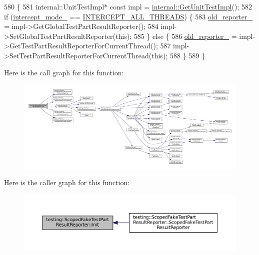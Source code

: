 \begin{DoxyCode}
580                                             \{
581   internal::UnitTestImpl* \textcolor{keyword}{const} impl = \hyperlink{namespacetesting_1_1internal_a9bd0caf5d16512de38b39599c13ee634}{internal::GetUnitTestImpl}();
582   \textcolor{keywordflow}{if} (\hyperlink{classtesting_1_1ScopedFakeTestPartResultReporter_ae62ed825619c11ac21fdd06480e0d982}{intercept\_mode\_} == \hyperlink{classtesting_1_1ScopedFakeTestPartResultReporter_a82f6209b3cf5c4b15ec8bd8041dbc2d5a187f4164aad7fbb9414b263c68a693cd}{INTERCEPT\_ALL\_THREADS}) \{
583     \hyperlink{classtesting_1_1ScopedFakeTestPartResultReporter_a4183b091842a83dd8ce4927746c43092}{old\_reporter\_} = impl->GetGlobalTestPartResultReporter();
584     impl->SetGlobalTestPartResultReporter(\textcolor{keyword}{this});
585   \} \textcolor{keywordflow}{else} \{
586     \hyperlink{classtesting_1_1ScopedFakeTestPartResultReporter_a4183b091842a83dd8ce4927746c43092}{old\_reporter\_} = impl->GetTestPartResultReporterForCurrentThread();
587     impl->SetTestPartResultReporterForCurrentThread(\textcolor{keyword}{this});
588   \}
589 \}
\end{DoxyCode}
Here is the call graph for this function\+:
\nopagebreak
\begin{figure}[H]
\begin{center}
\leavevmode
\includegraphics[width=350pt]{classtesting_1_1ScopedFakeTestPartResultReporter_a28d280a3f5d172d63b94f70b8e7660d7_cgraph}
\end{center}
\end{figure}
Here is the caller graph for this function\+:
\nopagebreak
\begin{figure}[H]
\begin{center}
\leavevmode
\includegraphics[width=350pt]{classtesting_1_1ScopedFakeTestPartResultReporter_a28d280a3f5d172d63b94f70b8e7660d7_icgraph}
\end{center}
\end{figure}
